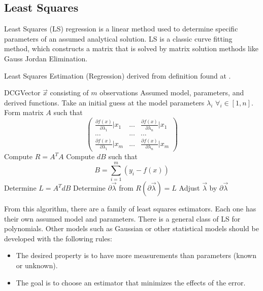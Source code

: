 \documentclass[11pt]{article}
\begin{document}
\subsection{Least Squares}
Least Squares (LS) regression is a linear method used to determine specific parameters of an assumed analytical solution.  LS is a classic curve fitting method, which constructs a matrix that is solved by matrix solution methods like Gauss Jordan Elimination.
\begin{algorithm}
\caption{Least Squares Estimation (Regression) derived from definition found at \cite{wolfram-mathworld-least-squares}.}
\label{alg:least-squares}
\begin{algorithmic}
\REQUIRE DCGVector $\vec{x}$ consisting of $m$ observations
\REQUIRE Assumed model, parameters, and derived functions.
\STATE Take an initial guess at the model parameters $\lambda _i$ $\forall _i \in [1, n]$.
\REPEAT
\STATE Form matrix $A$ such that 
\begin{equation}
\left(\begin{array}{ccc}
	\frac{\partial {f(x)} } {\partial{\lambda_1}} |x_1 & ... & \frac{\partial {f(x)} } {\partial{\lambda_n }} |x_1 \\
	... & ... & ... \\
	 \frac{\partial {f(x)} } {\partial{\lambda_1}} |x_m & ... &  \frac{\partial {f(x)} } {\partial{\lambda_n}} |x_m
\end{array}\right)
\end{equation}
\STATE Compute $R = A^T A$ 
\STATE Compute $dB$ such that 
\begin{equation}
B = \sum _{i= 1} ^{m} ( y_i - f(x) )
\end{equation} 
\STATE Determine $L = A^T dB$
\STATE Determine $\partial \vec{\lambda}$ from $R(\partial {\vec{\lambda}}) = L $
\STATE Adjust $\vec{\lambda}$ by $\partial \vec{\lambda}$
\end{algorithmic}
\end{algorithm} 
From this algorithm, there are a family of least squares estimators.   Each one has their own assumed model and parameters.   There is a general class of LS for polynomials.   Other models such as Gaussian or other statistical models should be developed with the following rules:

	\begin{itemize}
	\item The desired property is to have more measurements than parameters (known or unknown).
	\item The goal is to choose an estimator that minimizes the effects of the error.
	\end{itemize}
\end{document}
